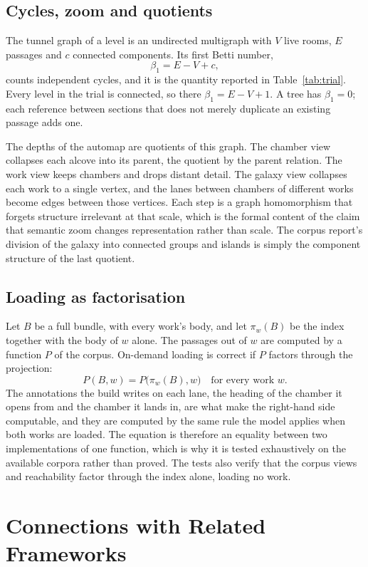 \documentclass[11pt]{article}
\theoremstyle{remark}
\begin{document}
\subsection{Cycles, zoom and quotients}

The tunnel graph of a level is an undirected multigraph with $V$ live rooms, $E$ passages and $c$ connected components. Its first Betti number,
\[
\beta_1 = E - V + c,
\]
counts independent cycles, and it is the quantity reported in Table~\ref{tab:trial}. Every level in the trial is connected, so there $\beta_1 = E - V + 1$. A tree has $\beta_1 = 0$; each reference between sections that does not merely duplicate an existing passage adds one.

The depths of the automap are quotients of this graph. The chamber view collapses each alcove into its parent, the quotient by the parent relation. The work view keeps chambers and drops distant detail. The galaxy view collapses each work to a single vertex, and the lanes between chambers of different works become edges between those vertices. Each step is a graph homomorphism that forgets structure irrelevant at that scale, which is the formal content of the claim that semantic zoom changes representation rather than scale. The corpus report's division of the galaxy into connected groups and islands is simply the component structure of the last quotient.

\subsection{Loading as factorisation}

Let $B$ be a full bundle, with every work's body, and let $\pi_w(B)$ be the index together with the body of $w$ alone. The passages out of $w$ are computed by a function $P$ of the corpus. On-demand loading is correct if $P$ factors through the projection:
\[
P(B, w) = P\bigl(\pi_w(B), w\bigr) \quad \text{for every work } w.
\]
The annotations the build writes on each lane, the heading of the chamber it opens from and the chamber it lands in, are what make the right-hand side computable, and they are computed by the same rule the model applies when both works are loaded. The equation is therefore an equality between two implementations of one function, which is why it is tested exhaustively on the available corpora rather than proved. The tests also verify that the corpus views and reachability factor through the index alone, loading no work.

\section{Connections with Related Frameworks}
\label{sec:connections}
\end{document}
